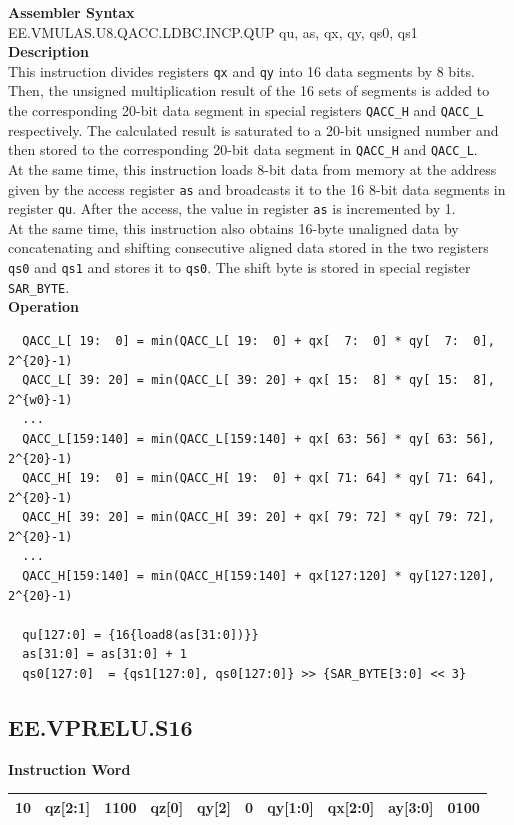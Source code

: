 \textbf{Assembler Syntax} \\
EE.VMULAS.U8.QACC.LDBC.INCP.QUP qu, as, qx, qy, qs0, qs1 \\
\textbf{Description} \\
This instruction divides registers \lstinline{qx} and \lstinline{qy} into 16 data segments by 8 bits. Then, the unsigned multiplication result of the 16 sets of segments is added to the corresponding 20-bit data segment in special registers \lstinline{QACC_H} and \lstinline{QACC_L} respectively. The calculated result is saturated to a 20-bit unsigned number and then stored to the corresponding 20-bit data segment in \lstinline{QACC_H} and \lstinline{QACC_L}.\\
At the same time, this instruction loads 8-bit data from memory at the address given by the access register \lstinline{as} and broadcasts it to the 16 8-bit data segments in register \lstinline{qu}. After the access, the value in register \lstinline{as} is incremented by 1.\\
At the same time, this instruction also obtains 16-byte unaligned data by concatenating and shifting consecutive aligned data stored in the two registers \lstinline{qs0} and \lstinline{qs1} and stores it to \lstinline{qs0}. The shift byte is stored in special register \lstinline{SAR_BYTE}.\\
\textbf{Operation}
\begin{lstlisting}
  QACC_L[ 19:  0] = min(QACC_L[ 19:  0] + qx[  7:  0] * qy[  7:  0], 2^{20}-1)
  QACC_L[ 39: 20] = min(QACC_L[ 39: 20] + qx[ 15:  8] * qy[ 15:  8], 2^{w0}-1)
  ...
  QACC_L[159:140] = min(QACC_L[159:140] + qx[ 63: 56] * qy[ 63: 56], 2^{20}-1)
  QACC_H[ 19:  0] = min(QACC_H[ 19:  0] + qx[ 71: 64] * qy[ 71: 64], 2^{20}-1)
  QACC_H[ 39: 20] = min(QACC_H[ 39: 20] + qx[ 79: 72] * qy[ 79: 72], 2^{20}-1)
  ...
  QACC_H[159:140] = min(QACC_H[159:140] + qx[127:120] * qy[127:120], 2^{20}-1)

  qu[127:0] = {16{load8(as[31:0])}}
  as[31:0] = as[31:0] + 1
  qs0[127:0]  = {qs1[127:0], qs0[127:0]} >> {SAR_BYTE[3:0] << 3}
\end{lstlisting}

\clearpage
\subsection{EE.VPRELU.S16}\label{instruction:EEVPRELUS16}
\setlength\tabcolsep{6pt}
\textbf{Instruction Word} \\
\begin{tabular}{|c|c|c|c|c|c|c|c|c|c|}
	\hline
	10 & qz[2:1] & 1100 & qz[0] & qy[2] & 0 & qy[1:0] & qx[2:0] & ay[3:0] & 0100 \\
	\hline
\end{tabular}

